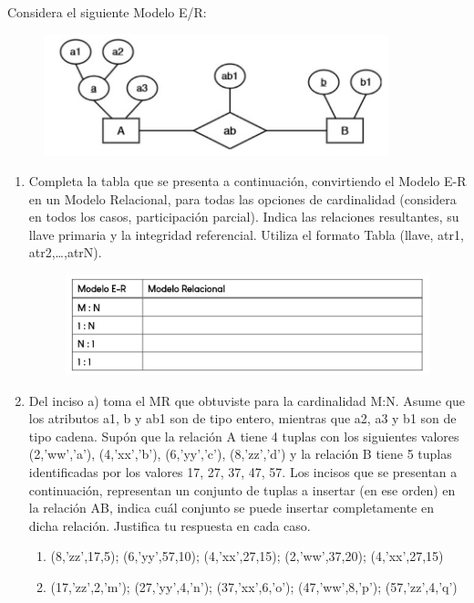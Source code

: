 \documentclass{exam}
\begin{document}
\begin{questions}
	Considera el siguiente Modelo E/R:
	\begin{figure}[h!]
			\includegraphics[width=10cm]{pregunta_3.png}
		\centering
		\end{figure}
		\begin{enumerate}[label=\alph*.]
			\item Completa la tabla que se presenta a continuación, convirtiendo el Modelo E-R en un Modelo Relacional, para todas
las opciones de cardinalidad (considera en todos los casos, participación parcial). Indica las relaciones resultantes,
su llave primaria y la integridad referencial. Utiliza el formato Tabla (llave, atr1, atr2,…,atrN).
			\begin{figure}[h!]
			\includegraphics[width=13cm]{pregunta_3_a.png}
		    \centering
		    \end{figure}
			\item Del inciso a) toma el MR que obtuviste para la cardinalidad M:N. Asume que los atributos a1, b y ab1 son de tipo
entero, mientras que a2, a3 y b1 son de tipo cadena. Supón que la relación A tiene 4 tuplas con los siguientes valores
(2,’ww’,’a’), (4,’xx’,’b’), (6,’yy’,’c’), (8,’zz’,’d’) y la relación B tiene 5 tuplas identificadas por
los valores 17, 27, 37, 47, 57. Los incisos que se presentan a continuación, representan un conjunto de tuplas
a insertar (en ese orden) en la relación AB, indica cuál conjunto se puede insertar completamente en dicha relación.
Justifica tu respuesta en cada caso.
\begin{enumerate}[label=\roman*.]
				\item (8,’zz’,17,5); (6,’yy’,57,10); (4,’xx’,27,15); (2,’ww’,37,20); (4,’xx’,27,15)
				\item (17,’zz’,2,’m’); (27,’yy’,4,’n’); (37,’xx’,6,’o’); (47,’ww’,8,’p’); (57,’zz’,4,’q’)

\end{enumerate}
\end{enumerate}
\end{questions}
\end{document}
